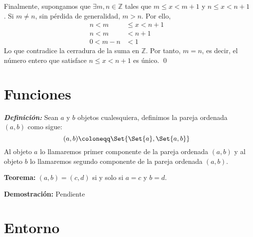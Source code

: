 \documentclass[11pt]{article}
\newcommand{\N}{\mathbb{N}}
\newcommand{\Z}{\mathbb{Z}}
\newcommand{\bfit}[1]{\textbf{\textit{#1}}}
\let\set\Set
\begin{document}
\begin{enumerate}[label=\alph*)]
    Finalmente, supongamos que $\exists m, n\in \Z$ tales que $m\leq x<m+1$ y $n\leq x<n+1$. Si $m\neq n$, sin pérdida de generalidad, $m>n$. Por ello, \begin{align*}
        n < m &\leq x<n+1 \\
        n < m &<n+1 \\
        0 < m-n &<1
    \end{align*}  
    Lo que contradice la cerradura de la suma en $\Z$. Por tanto, $m=n$, es decir, el número entero que satisface $n\leq x<n+1$ es único. \qed
%    
%
\end{enumerate}

\section*{Funciones}

\bfit{Definición:}  Sean $a$ y $b$ objetos cualesquiera, definimos la pareja ordenada $(a,b)$ como sigue: \[
    (a,b)\coloneqq \set{\set{a}, \set{a,b}}\]
Al objeto $a$ lo llamaremos primer componente de la pareja ordenada $(a,b)$ y al objeto $b$ lo llamaremos segundo componente de la pareja ordenada $(a,b)$.

\textbf{Teorema:} $(a,b)=(c,d)$ si y solo si $a=c$ y $b=d$.

\textbf{Demostración:} Pendiente

\pagebreak

\section*{Entorno}
\end{document}
